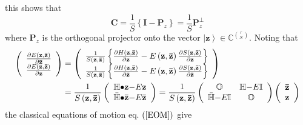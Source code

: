 \documentclass[aps,preprint]{revtex4}%
\begin{document}
this shows that
\begin{equation}
\mathbf{C}=\frac{1}{S}\left\{  \mathbf{I-P}_{z}\right\}  =\frac{1}%
{S}\mathbf{P}_{z}^{\bot}%
\end{equation}
where $\mathbf{P}_{z}$ is the orthogonal projector onto the vector $\left\vert
\mathbf{z}\right\rangle \in\mathbb{C}^{\binom{r}{N}}$. Noting that
\begin{align}
\left(
\begin{array}
[c]{c}%
\frac{\partial E\left(  \mathbf{z},\mathbf{\bar{z}}\right)  }{\partial
\mathbf{\bar{z}}}\\
\frac{\partial E\left(  \mathbf{z},\mathbf{\bar{z}}\right)  }{\partial
\mathbf{z}}%
\end{array}
\right)   &  =\left(
\begin{array}
[c]{c}%
\frac{1}{S\left(  \mathbf{z},\mathbf{\bar{z}}\right)  }\left\{  \frac{\partial
H\left(  \mathbf{z},\mathbf{\bar{z}}\right)  }{\partial\mathbf{z}}-E\left(
\mathbf{z},\mathbf{\bar{z}}\right)  \frac{\partial S\left(  \mathbf{z}%
,\mathbf{\bar{z}}\right)  }{\partial\mathbf{z}}\right\} \\
\frac{1}{S\left(  \mathbf{z},\mathbf{\bar{z}}\right)  }\left\{  \frac{\partial
H\left(  \mathbf{z},\mathbf{\bar{z}}\right)  }{\partial\mathbf{\bar{z}}%
}-E\left(  \mathbf{z},\mathbf{\bar{z}}\right)  \frac{\partial S\left(
\mathbf{z},\mathbf{\bar{z}}\right)  }{\partial\mathbf{\bar{z}}}\right\}
\end{array}
\right) \\
&  =\frac{1}{S\left(  \mathbf{z},\mathbf{\bar{z}}\right)  }\left(
\begin{array}
[c]{c}%
\mathbb{H}\mathbf{\bullet z-}E\mathbf{z}\\
\mathbb{\bar{H}}\mathbf{\bullet\bar{z}-}E\mathbf{\bar{z}}%
\end{array}
\right)  =\frac{1}{S\left(  \mathbf{z},\mathbf{\bar{z}}\right)  }\left(
\begin{array}
[c]{cc}%
\mathbb{O} & \mathbb{H}\mathbf{-}E\mathbb{I}\\
\mathbb{\bar{H}}\mathbf{-}E\mathbb{I} & \mathbb{O}%
\end{array}
\right)  \left(
\begin{array}
[c]{c}%
\mathbf{\bar{z}}\\
\mathbf{z}%
\end{array}
\right)
\end{align}
the classical equations of motion eq. $\left(  \ref{EOM}\right)  $ give
\end{document}
